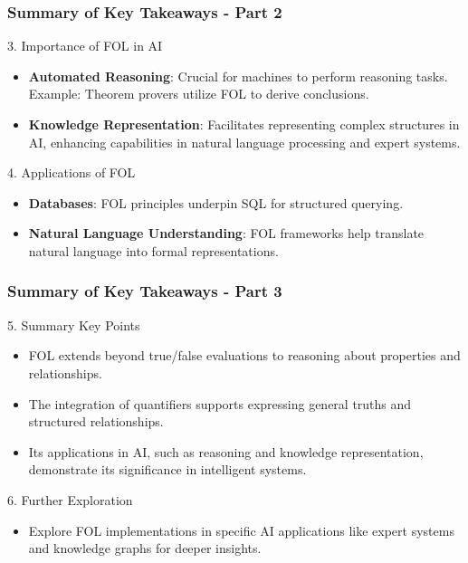 \documentclass[aspectratio=169]{beamer}
\begin{document}
\begin{frame}[fragile]
    \frametitle{Summary of Key Takeaways - Part 2}

    \begin{block}{3. Importance of FOL in AI}
        \begin{itemize}
            \item \textbf{Automated Reasoning}: 
                Crucial for machines to perform reasoning tasks. 
                Example: Theorem provers utilize FOL to derive conclusions.
            \item \textbf{Knowledge Representation}: 
                Facilitates representing complex structures in AI, enhancing capabilities in natural language processing and expert systems.
        \end{itemize}
    \end{block}

    \begin{block}{4. Applications of FOL}
        \begin{itemize}
            \item \textbf{Databases}: FOL principles underpin SQL for structured querying.
            \item \textbf{Natural Language Understanding}: 
                FOL frameworks help translate natural language into formal representations.
        \end{itemize}
    \end{block}
\end{frame}

\begin{frame}[fragile]
    \frametitle{Summary of Key Takeaways - Part 3}

    \begin{block}{5. Summary Key Points}
        \begin{itemize}
            \item FOL extends beyond true/false evaluations to reasoning about properties and relationships.
            \item The integration of quantifiers supports expressing general truths and structured relationships.
            \item Its applications in AI, such as reasoning and knowledge representation, demonstrate its significance in intelligent systems.
        \end{itemize}
    \end{block}

    \begin{block}{6. Further Exploration}
        \begin{itemize}
            \item Explore FOL implementations in specific AI applications like expert systems and knowledge graphs for deeper insights.
        \end{itemize}
    \end{block}
\end{frame}
\end{document}
